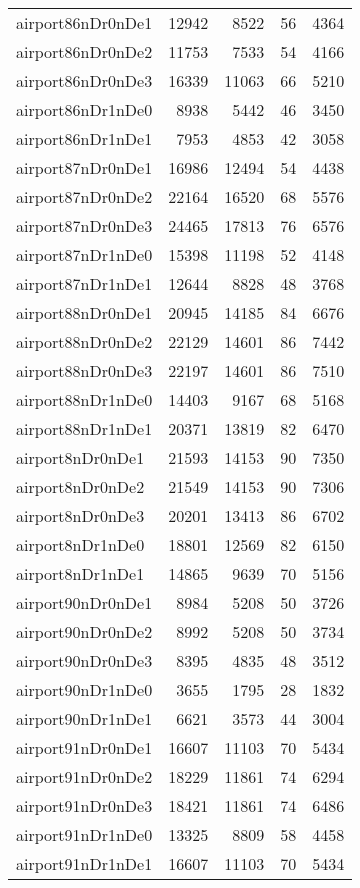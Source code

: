 \begin{longtable}{lrrrr}
airport86nDr0nDe1 & 12942 & 8522 & 56 & 4364 \\
airport86nDr0nDe2 & 11753 & 7533 & 54 & 4166 \\
airport86nDr0nDe3 & 16339 & 11063 & 66 & 5210 \\
airport86nDr1nDe0 & 8938 & 5442 & 46 & 3450 \\
airport86nDr1nDe1 & 7953 & 4853 & 42 & 3058 \\
airport87nDr0nDe1 & 16986 & 12494 & 54 & 4438 \\
airport87nDr0nDe2 & 22164 & 16520 & 68 & 5576 \\
airport87nDr0nDe3 & 24465 & 17813 & 76 & 6576 \\
airport87nDr1nDe0 & 15398 & 11198 & 52 & 4148 \\
airport87nDr1nDe1 & 12644 & 8828 & 48 & 3768 \\
airport88nDr0nDe1 & 20945 & 14185 & 84 & 6676 \\
airport88nDr0nDe2 & 22129 & 14601 & 86 & 7442 \\
airport88nDr0nDe3 & 22197 & 14601 & 86 & 7510 \\
airport88nDr1nDe0 & 14403 & 9167 & 68 & 5168 \\
airport88nDr1nDe1 & 20371 & 13819 & 82 & 6470 \\
airport8nDr0nDe1 & 21593 & 14153 & 90 & 7350 \\
airport8nDr0nDe2 & 21549 & 14153 & 90 & 7306 \\
airport8nDr0nDe3 & 20201 & 13413 & 86 & 6702 \\
airport8nDr1nDe0 & 18801 & 12569 & 82 & 6150 \\
airport8nDr1nDe1 & 14865 & 9639 & 70 & 5156 \\
airport90nDr0nDe1 & 8984 & 5208 & 50 & 3726 \\
airport90nDr0nDe2 & 8992 & 5208 & 50 & 3734 \\
airport90nDr0nDe3 & 8395 & 4835 & 48 & 3512 \\
airport90nDr1nDe0 & 3655 & 1795 & 28 & 1832 \\
airport90nDr1nDe1 & 6621 & 3573 & 44 & 3004 \\
airport91nDr0nDe1 & 16607 & 11103 & 70 & 5434 \\
airport91nDr0nDe2 & 18229 & 11861 & 74 & 6294 \\
airport91nDr0nDe3 & 18421 & 11861 & 74 & 6486 \\
airport91nDr1nDe0 & 13325 & 8809 & 58 & 4458 \\
airport91nDr1nDe1 & 16607 & 11103 & 70 & 5434 \\

\end{longtable}

